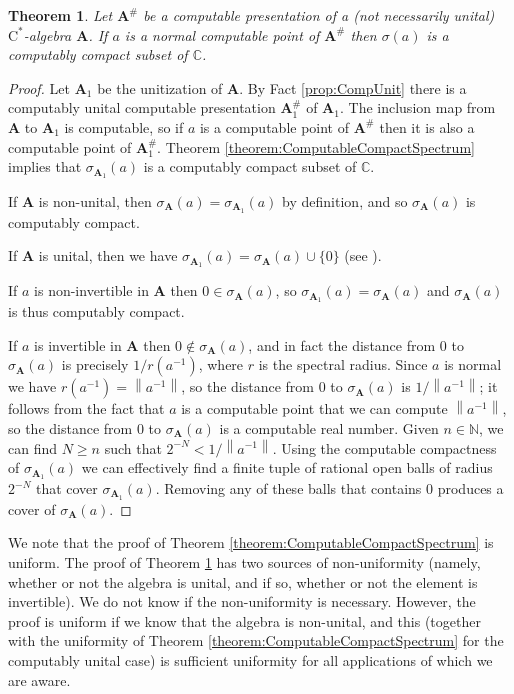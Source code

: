 \documentclass{amsart}
\newcommand{\norm}[1]{\left\| #1 \right\|}
\newcommand{\boldA}{\mathbf{A}}
\newcommand{\cstar}{$\mathrm{C}^*$}
\theoremstyle{plain}
\newtheorem{theorem}{Theorem}[section]
\theoremstyle{definition}
\numberwithin{equation}{section}
\begin{document}
\begin{theorem}\label{theorem:ComputableCompactSpectrumNonunital}
Let $\boldA^\#$ be a computable presentation of a (not necessarily unital) \cstar-algebra $\boldA$.  If $a$ is a normal computable point of $\boldA^\#$ then $\sigma(a)$ is a computably compact subset of $\mathbb{C}$.
\end{theorem}
\begin{proof}
Let $\boldA_1$ be the unitization of $\boldA$.  By Fact \ref{prop:CompUnit} there is a computably unital computable presentation $\boldA_1^\#$ of $\boldA_1$.  The inclusion map from $\boldA$ to $\boldA_1$ is computable, so if $a$ is a computable point of $\boldA^\#$ then it is also a computable point of $\boldA_1^\#$.  Theorem \ref{theorem:ComputableCompactSpectrum} implies that $\sigma_{\boldA_1}(a)$ is a computably compact subset of $\mathbb{C}$.  

If $\boldA$ is non-unital, then $\sigma_{\boldA}(a) = \sigma_{\boldA_1}(a)$ by definition, and so $\sigma_{\boldA}(a)$ is computably compact.

If $\boldA$ is unital, then we have $\sigma_{\boldA_1}(a) = \sigma_{\boldA}(a) \cup \{0\}$ (see \cite[paragraph after Remark 2.2.1]{Murphy.1990}).  

If $a$ is non-invertible in $\boldA$ then $0 \in \sigma_\boldA(a)$, so $\sigma_{\boldA_1}(a) = \sigma_{\boldA}(a)$ and $\sigma_{\boldA}(a)$ is thus computably compact.

If $a$ is invertible in $\boldA$ then $0 \not\in \sigma_{\boldA}(a)$, and in fact the distance from $0$ to $\sigma_{\boldA}(a)$ is precisely $1/r(a^{-1})$, where $r$ is the spectral radius.  Since $a$ is normal we have $r(a^{-1}) = \norm{a^{-1}}$, so the distance from $0$ to $\sigma_\boldA(a)$ is $1/\norm{a^{-1}}$; it follows from the fact that $a$ is a computable point that we can compute $\norm{a^{-1}}$, so the distance from $0$ to $\sigma_{\boldA}(a)$ is a computable real number.  Given $n \in \mathbb{N}$, we can find $N \geq n$ such that $2^{-N} < 1/\norm{a^{-1}}$.  Using the computable compactness of $\sigma_{\boldA_1}(a)$ we can effectively find a finite tuple of rational open balls of radius $2^{-N}$ that cover $\sigma_{\boldA_1}(a)$.  Removing any of these balls that contains $0$ produces a cover of $\sigma_{\boldA}(a)$.
\end{proof}

We note that the proof of Theorem \ref{theorem:ComputableCompactSpectrum} is uniform.  The proof of Theorem \ref{theorem:ComputableCompactSpectrumNonunital} has two sources of non-uniformity (namely, whether or not the algebra is unital, and if so, whether or not the element is invertible).  We do not know if the non-uniformity is necessary.  However, the proof is uniform if we know that the algebra is non-unital, and this (together with the uniformity of Theorem \ref{theorem:ComputableCompactSpectrum} for the computably unital case) is sufficient uniformity for all applications of which we are aware.
\end{document}
